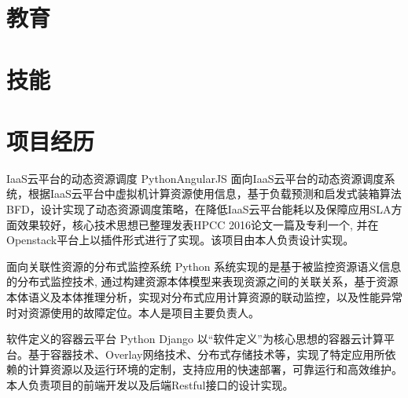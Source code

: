 \documentclass[11pt,a4paper]{moderncv}
\title{}               %
\begin{document}
\maketitle

\vspace*{-3mm}

\section{教育}

\vspace*{-1mm}

\section{技能}

\vspace*{-1mm}

\section{项目经历}
\renewcommand{\baselinestretch}{1.2}

{IaaS云平台的动态资源调度}
{Python}{AngularJS}{}
{面向IaaS云平台的动态资源调度系统，根据IaaS云平台中虚拟机计算资源使用信息，基于负载预测和启发式装箱算法BFD，设计实现了动态资源调度策略，在降低IaaS云平台能耗以及保障应用SLA方面效果较好，核心技术思想已整理发表HPCC 2016论文一篇及专利一个, 并在Openstack平台上以插件形式进行了实现。该项目由本人负责设计实现。}

\vspace*{0.2\baselineskip}
{面向关联性资源的分布式监控系统}
{Python}
{}{}
{系统实现的是基于被监控资源语义信息的分布式监控技术, 通过构建资源本体模型来表现资源之间的关联关系，基于资源本体语义及本体推理分析，实现对分布式应用计算资源的联动监控，以及性能异常时对资源使用的故障定位。本人是项目主要负责人。}

\vspace*{0.2\baselineskip}
{软件定义的容器云平台}
{Python}
{Django}{}
{以“软件定义”为核心思想的容器云计算平台。基于容器技术、Overlay网络技术、分布式存储技术等，实现了特定应用所依赖的计算资源以及运行环境的定制，支持应用的快速部署，可靠运行和高效维护。本人负责项目的前端开发以及后端Restful接口的设计实现。}
\vspace*{0.2\baselineskip}
\end{document}
